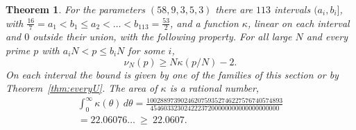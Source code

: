 \documentclass[11pt]{amsart}
\newcommand{\Chi}{22.06076}
\newcommand{\ChiLean}{22.0607}
\newtheorem{theorem}{Theorem}[section]
\theoremstyle{definition}
\theoremstyle{remark}
\numberwithin{equation}{section}
\begin{document}
\begin{theorem}\label{thm:profile-D}
For the parameters $(58,9,3,5,3)$ there are $113$ intervals $(a_i,b_i]$, with
$\frac{16}7=a_1<b_1\le a_2<\dots<b_{113}=\frac{53}2$, and a function $\kappa$, linear on each interval and $0$
outside their union, with the following property. For all large $N$ and every prime $p$ with
$a_iN<p\le b_iN$ for some $i$,
\[
 \nu_N(p)\ge N\kappa(p/N)-2 .
\]
On each interval the bound is given by one of the families of this section or by
Theorem~\ref{thm:everyU}. The area of $\kappa$ is a rational number,
\begin{multline*}
 \int_0^\infty\kappa(\theta)\,d\theta=\frac{1002889739024620759352746227576740574893}{45460332302422237200000000000000000000}\\
 =\Chi\ldots\ \ge\ \ChiLean .
\end{multline*}
\end{theorem}
\end{document}
